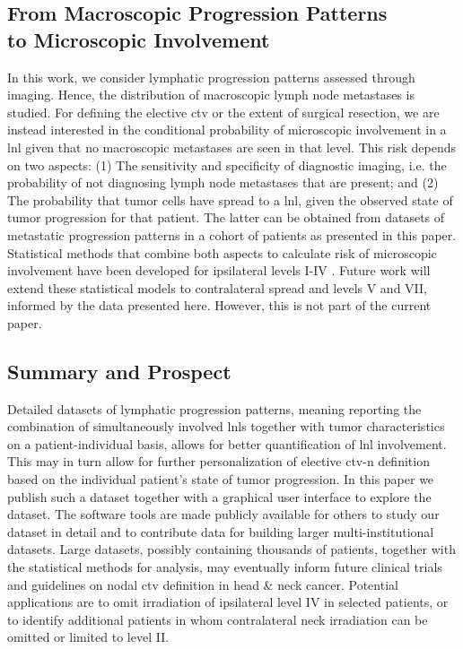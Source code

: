 \documentclass[\relativeRoot/main.tex]{subfiles}
\begin{document}
\subsection*{From Macroscopic Progression Patterns\\to Microscopic Involvement}

In this work, we consider lymphatic progression patterns assessed through imaging. Hence, the distribution of macroscopic lymph node metastases is studied. For defining the elective \gls{ctv} or the extent of surgical resection, we are instead interested in the conditional probability of microscopic involvement in a \gls{lnl} given that no macroscopic metastases are seen in that level. This risk depends on two aspects: (1) The sensitivity and specificity of diagnostic imaging, i.e. the probability of not diagnosing lymph node metastases that are present; and (2) The probability that tumor cells have spread to a \gls{lnl}, given the observed state of tumor progression for that patient. The latter can be obtained from datasets of metastatic progression patterns in a cohort of patients as presented in this paper. Statistical methods that combine both aspects to calculate risk of microscopic involvement have been developed for ipsilateral levels I-IV \cite{pouymayou_bayesian_2019,ludwig_hidden_2021}. Future work will extend these statistical models to contralateral spread and levels V and VII, informed by the data presented here. However, this is not part of the current paper.

\subsection*{Summary and Prospect}

Detailed datasets of lymphatic progression patterns, meaning reporting the combination of simultaneously involved \glspl{lnl} together with tumor characteristics on a patient-individual basis, allows for better quantification of \gls{lnl} involvement. This may in turn allow for further personalization of elective \gls{ctv-n} definition based on the individual patient's state of tumor progression. In this paper we publish such a dataset together with a graphical user interface to explore the dataset. The software tools are made publicly available for others to study our dataset in detail and to contribute data for building larger multi-institutional datasets. Large datasets, possibly containing thousands of patients, together with the statistical methods for analysis, may eventually inform future clinical trials and guidelines on nodal \gls{ctv} definition in head \& neck cancer. Potential applications are to omit irradiation of ipsilateral level IV in selected patients, or to identify additional patients in whom contralateral neck irradiation can be omitted or limited to level II.
\end{document}

